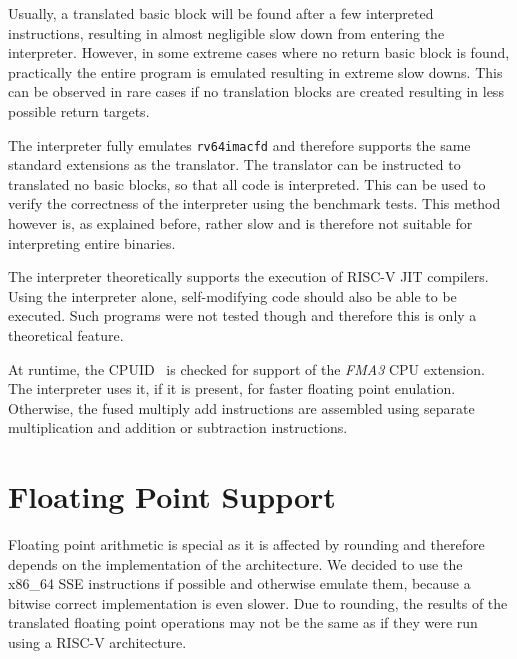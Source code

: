 \documentclass[course=eragp]{aspdoc}
\begin{document}
\par

Usually, a translated basic block will be found after a few interpreted instructions, resulting in almost
negligible slow down from entering the interpreter. However, in some extreme cases where no return
basic block is found, practically the entire program is emulated resulting in extreme slow downs.
This can be observed in rare cases if no translation blocks are created resulting in less possible
return targets.

\par

The interpreter fully emulates \texttt{rv64imacfd} and therefore supports the same standard
extensions as the translator. The translator can be instructed to translated no basic blocks, so
that all code is interpreted. This can be used to verify the
correctness of the interpreter using the benchmark tests. This method however is, as explained
before, rather slow and is therefore not suitable for interpreting entire binaries.

\par

The interpreter theoretically supports the execution of RISC-V JIT compilers. Using the interpreter
alone, self-modifying code should also be able to be executed. Such programs were not tested though and
therefore this is only a theoretical feature.

\par

At runtime, the CPUID~\cite{intel2017man} is checked for support of the \textit{FMA3} CPU extension.
The interpreter uses it, if it is
present, for faster floating point enulation. Otherwise, the fused multiply
add instructions are assembled using separate multiplication and addition or subtraction
instructions.

\par

\section{Floating Point Support}\label{sec:floating_point}

Floating point arithmetic is special as it is affected by rounding and therefore depends on the
implementation of the architecture. We decided to use the x86\_64 SSE instructions if possible and
otherwise emulate them, because a bitwise correct implementation is even slower. Due to rounding, the
results of the translated floating point operations may not be the same as if they were run using a
RISC-V architecture.
\end{document}
